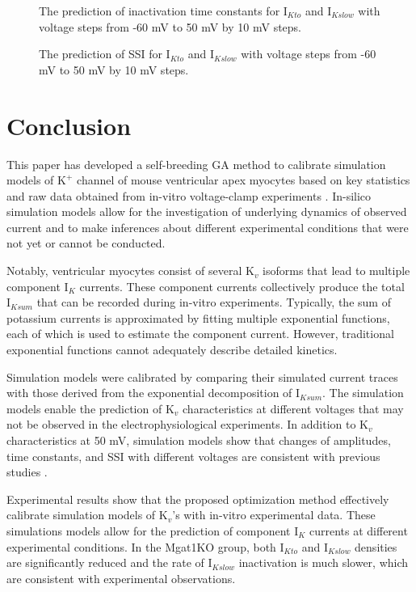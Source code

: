 \documentclass[10pt,letterpaper]{article}
\begin{document}
\begin{figure}[!ht]
    \centering
    \caption{The prediction of inactivation time constants for $\text{I}_{Kto}$ and $\text{I}_{Kslow}$ with voltage steps from -60 mV to 50 mV by 10 mV steps.} 
    \label{fig9}
\end{figure}

\begin{figure}[!ht]
    \centering
    \caption{The prediction of SSI for $\text{I}_{Kto}$ and $\text{I}_{Kslow}$ with voltage steps from -60 mV to 50 mV by 10 mV steps.} 
    \label{fig10}
\end{figure}

\section*{Conclusion}
This paper has developed a self-breeding GA method to calibrate simulation models of $\text{K}^{+}$ channel of mouse ventricular apex myocytes based on key statistics and raw data obtained from in-vitro voltage-clamp experiments \cite{ednie2019reduced}. In-silico simulation models allow for the investigation of underlying dynamics of observed current and to make inferences about different experimental conditions that were not yet or cannot be conducted.

Notably, ventricular myocytes consist of several $\text{K}_{v}$ isoforms that lead to multiple component $\text{I}_{K}$ currents. These component currents collectively produce the total $\text{I}_{Ksum}$ that can be recorded during in-vitro experiments. Typically, the sum of potassium currents is approximated by fitting multiple exponential functions, each of which is used to estimate the component current. However, traditional exponential functions cannot adequately describe detailed kinetics.

Simulation models were calibrated by comparing their simulated current traces with those derived from the exponential decomposition of $\text{I}_{Ksum}$. The simulation models enable the prediction of $\text{K}_{v}$ characteristics at different voltages that may not be observed in the electrophysiological experiments. In addition to $\text{K}_{v}$ characteristics at 50 mV, simulation models show that changes of amplitudes, time constants, and SSI with different voltages are consistent with previous studies \cite{ednie2019reduced}.

Experimental results show that the proposed optimization method effectively calibrate simulation models of $\text{K}_{v}$'s with in-vitro experimental data. These simulations models allow for the prediction of component $\text{I}_{K}$ currents at different experimental conditions. In the Mgat1KO group, both $\text{I}_{Kto}$ and $\text{I}_{Kslow}$ densities are significantly reduced and the rate of $\text{I}_{Kslow}$ inactivation is much slower, which are consistent with experimental observations.
\end{document}
